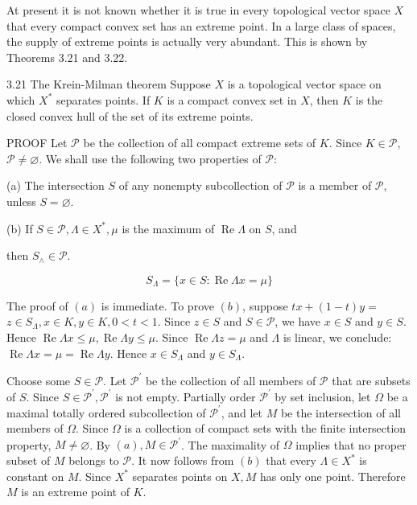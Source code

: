 \documentclass[10pt]{article}
\begin{document}
At present it is not known whether it is true in every topological vector space $X$ that every compact convex set has an extreme point. In a large class of spaces, the supply of extreme points is actually very abundant. This is shown by Theorems 3.21 and 3.22.

3.21 The Krein-Milman theorem Suppose $X$ is a topological vector space on which $X^{*}$ separates points. If $K$ is a compact convex set in $X$, then $K$ is the closed convex hull of the set of its extreme points.

PROOF Let $\mathscr{P}$ be the collection of all compact extreme sets of $K$. Since $K \in \mathscr{P}$, $\mathscr{P} \neq \varnothing$. We shall use the following two properties of $\mathscr{P}:$

(a) The intersection $S$ of any nonempty subcollection of $\mathscr{P}$ is a member of $\mathscr{P}$, unless $S=\varnothing$.

(b) If $S \in \mathscr{P}, \Lambda \in X^{*}, \mu$ is the maximum of $\operatorname{Re} \Lambda$ on $S$, and

then $S_{\wedge} \in \mathscr{P}$.

$$
S_{\Lambda}=\{x \in S: \operatorname{Re} \Lambda x=\mu\}
$$

The proof of $(a)$ is immediate. To prove $(b)$, suppose $t x+(1-t) y=$ $z \in S_{\Lambda}, x \in K, y \in K, 0<t<1$. Since $z \in S$ and $S \in \mathscr{P}$, we have $x \in S$ and $y \in S$. Hence $\operatorname{Re} \Lambda x \leq \mu, \operatorname{Re} \Lambda y \leq \mu$. Since $\operatorname{Re} \Lambda z=\mu$ and $\Lambda$ is linear, we conclude: $\operatorname{Re} \Lambda x=\mu=\operatorname{Re} \Lambda y$. Hence $x \in S_{\Lambda}$ and $y \in S_{\Lambda}$.

Choose some $S \in \mathscr{P}$. Let $\mathscr{P}^{\prime}$ be the collection of all members of $\mathscr{P}$ that are subsets of $S$. Since $S \in \mathscr{P}^{\prime}, \mathscr{P}^{\prime}$ is not empty. Partially order $\mathscr{P}^{\prime}$ by set inclusion, let $\Omega$ be a maximal totally ordered subcollection of $\mathscr{P}^{\prime}$, and let $M$ be the intersection of all members of $\Omega$. Since $\Omega$ is a collection of compact sets with the finite intersection property, $M \neq \varnothing$. By $(a), M \in \mathscr{P}^{\prime}$. The maximality of $\Omega$ implies that no proper subset of $M$ belongs to $\mathscr{P}$. It now follows from $(b)$ that every $\Lambda \in X^{*}$ is constant on $M$. Since $X^{*}$ separates points on $X, M$ has only one point. Therefore $M$ is an extreme point of $K$.
\end{document}
